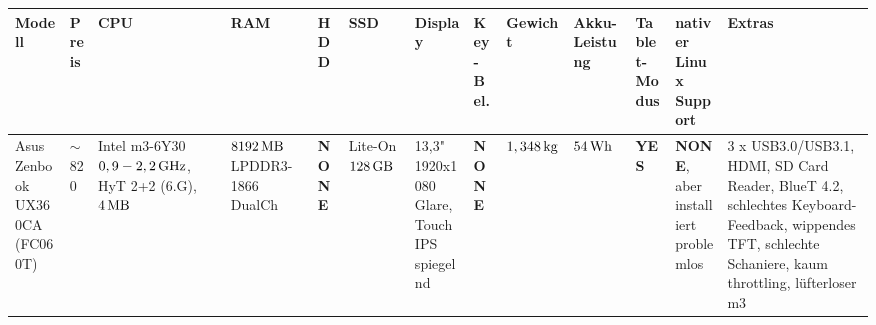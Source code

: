 \documentclass[numbers=noenddot,a4paper]{scrartcl}
\newcommand{\fett}[1]{\textbf{#1}}  %
\begin{document}
		\newpage
		
		\thispagestyle{empty}
		
		\begin{landscape}
				
			\begin{table}[h]
				
				\begin{tabular}{m{1.25cm}|m{1cm}|m{1.75cm}|m{1.5cm}|m{1.5cm}|m{1.5cm}|m{2.5cm}|m{1cm}|m{1.5cm}|m{1.5cm}|m{1cm}|m{3cm}|m{3cm}}
					
					Modell & Preis & CPU & RAM & HDD & SSD & Display & Key-Bel. & Gewicht & Akku-Leistung & Tablet-Modus & nativer Linux Support & Extras \\ \hline\hline
					
					Asus Zenbook UX360CA (FC060T) & $\sim$820\texteuro & Intel m3-6Y30 $\unit[0,9-2,2]{GHz}$, HyT 2+2 (6.G), $\unit[4]{MB}$ & $\unit[8192]{MB}$ LPDDR3-1866 DualCh & \fett{NONE} & Lite-On $\unit[128]{GB}$ & 13,3" 1920x1080 Glare, Touch IPS spiegelnd & \fett{NONE} & $\unit[1,348]{kg}$ & $\unit[54]{Wh}$ & \fett{YES} & \fett{NONE}, aber installiert problemlos & 3 x USB3.0/USB3.1, HDMI, SD Card Reader, BlueT 4.2, schlechtes Keyboard-Feedback, wippendes TFT, schlechte Schaniere, kaum throttling, lüfterloser m3\\
					
				\end{tabular}
				
			\end{table}
			
		\end{landscape}
	
\end{document}

